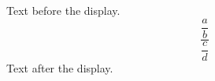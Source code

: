 \documentclass{article}
\begin{document}
Text before the display.
\[
  \frac{\dfrac{a}{b}}{\dfrac{c}{d}}
\]
Text after the display.
\end{document}
